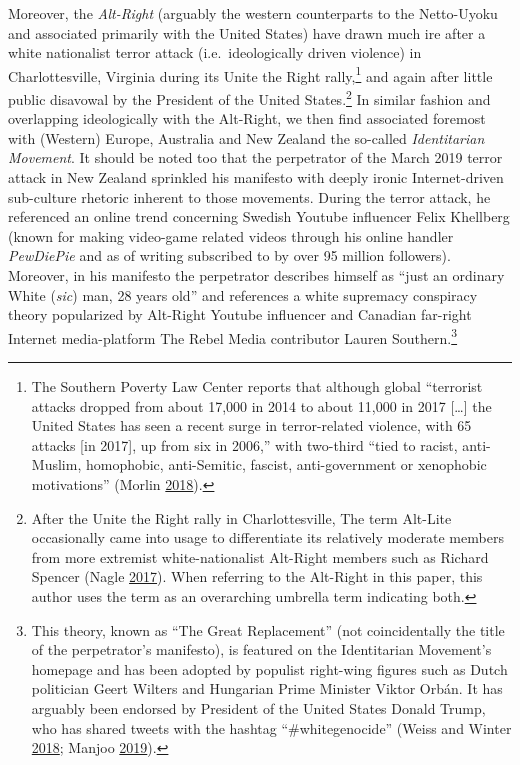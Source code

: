 \documentclass[10pt,british,A4paper,,openany]{memoir}
\begin{document}
Moreover, the \emph{Alt-Right} (arguably the western counterparts to the
Netto-Uyoku and associated primarily with the United States) have drawn
much ire after a white nationalist terror attack (i.e.~ideologically
driven violence) in Charlottesville, Virginia during its Unite the Right
rally,\footnote{The Southern Poverty Law Center reports that although
  global ``terrorist attacks dropped from about 17,000 in 2014 to about
  11,000 in 2017 {[}\ldots{}{]} the United States has seen a recent
  surge in terror-related violence, with 65 attacks {[}in 2017{]}, up
  from six in 2006,'' with two-third ``tied to racist, anti-Muslim,
  homophobic, anti-Semitic, fascist, anti-government or xenophobic
  motivations'' (Morlin
  \protect\hyperlink{ref-morlin_study_2018}{2018}).} and again after
little public disavowal by the President of the United States.\footnote{After
  the Unite the Right rally in Charlottesville, The term Alt-Lite
  occasionally came into usage to differentiate its relatively moderate
  members from more extremist white-nationalist Alt-Right members such
  as Richard Spencer (Nagle
  \protect\hyperlink{ref-nagle_kill_2017}{2017}). When referring to the
  Alt-Right in this paper, this author uses the term as an overarching
  umbrella term indicating both.} In similar fashion and overlapping
ideologically with the Alt-Right, we then find associated foremost with
(Western) Europe, Australia and New Zealand the so-called
\emph{Identitarian Movement}. It should be noted too that the
perpetrator of the March 2019 terror attack in New Zealand sprinkled his
manifesto with deeply ironic Internet-driven sub-culture rhetoric
inherent to those movements. During the terror attack, he referenced an
online trend concerning Swedish Youtube influencer Felix Khellberg
(known for making video-game related videos through his online handler
\emph{PewDiePie} and as of writing subscribed to by over 95 million
followers). Moreover, in his manifesto the perpetrator describes himself
as ``just an ordinary White (\emph{sic}) man, 28 years old'' and
references a white supremacy conspiracy theory popularized by Alt-Right
Youtube influencer and Canadian far-right Internet media-platform The
Rebel Media contributor Lauren Southern.\footnote{This theory, known as
  ``The Great Replacement'' (not coincidentally the title of the
  perpetrator's manifesto), is featured on the Identitarian Movement's
  homepage and has been adopted by populist right-wing figures such as
  Dutch politician Geert Wilters and Hungarian Prime Minister Viktor
  Orbán. It has arguably been endorsed by President of the United States
  Donald Trump, who has shared tweets with the hashtag
  ``\#whitegenocide'' (Weiss and Winter
  \protect\hyperlink{ref-weiss_opinion_2018}{2018}; Manjoo
  \protect\hyperlink{ref-manjoo_opinion_2019}{2019}).}
\end{document}
